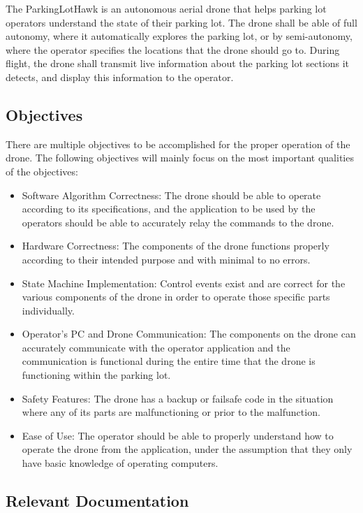 \documentclass[12pt, titlepage]{article}
\begin{document}
The ParkingLotHawk is an autonomous aerial drone that helps parking lot operators understand the state of their parking lot. The drone shall be able of full autonomy, where it automatically explores the parking lot, or by semi-autonomy, where the operator specifies the locations that the drone should go to. During flight, the drone shall transmit live information about the parking lot sections it detects, and display this information to the operator. 

\subsection{Objectives}

There are multiple objectives to be accomplished for the proper operation of the drone. The following objectives will mainly focus on the most important qualities of the objectives:

\begin{itemize}
    \item Software Algorithm Correctness: The drone should be able to operate according to its specifications, and the application to be used by the operators should be able to accurately relay the commands to the drone.
    \item Hardware Correctness: The components of the drone functions properly according to their intended purpose and with minimal to no errors.
    \item State Machine Implementation: Control events exist and are correct for the various components of the drone in order to operate those specific parts individually.
    \item Operator's PC and Drone Communication: The components on the drone can accurately communicate with the operator application and the communication is functional during the entire time that the drone is functioning within the parking lot.
    \item Safety Features: The drone has a backup or failsafe code in the situation where any of its parts are malfunctioning or prior to the malfunction.
    \item Ease of Use: The operator should be able to properly understand how to operate the drone from the application, under the assumption that they only have basic knowledge of operating computers.
\end{itemize}

\subsection{Relevant Documentation}
\end{document}
